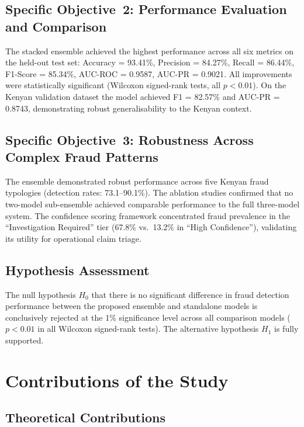 \documentclass[12pt,a4paper,oneside]{report}
\numberwithin{equation}{chapter}
\begin{document}
\subsection{Specific Objective~2: Performance Evaluation and Comparison}

The stacked ensemble achieved the highest performance across all six metrics on the held-out test
set: Accuracy = 93.41\%, Precision = 84.27\%, Recall = 86.44\%, F1-Score = 85.34\%,
AUC-ROC = 0.9587, AUC-PR = 0.9021. All improvements were statistically significant (Wilcoxon
signed-rank tests, all $p < 0.01$). On the Kenyan validation dataset the model achieved
F1 = 82.57\% and AUC-PR = 0.8743, demonstrating robust generalisability to the Kenyan context.

\subsection{Specific Objective~3: Robustness Across Complex Fraud Patterns}

The ensemble demonstrated robust performance across five Kenyan fraud typologies (detection rates:
73.1--90.1\%). The ablation studies confirmed that no two-model sub-ensemble achieved comparable
performance to the full three-model system. The confidence scoring framework concentrated fraud
prevalence in the ``Investigation Required'' tier (67.8\% vs.\ 13.2\% in ``High Confidence''),
validating its utility for operational claim triage.

\subsection{Hypothesis Assessment}

The null hypothesis $H_0$ that there is no significant difference in fraud detection performance
between the proposed ensemble and standalone models is conclusively rejected at the 1\%
significance level across all comparison models ($p < 0.01$ in all Wilcoxon signed-rank tests).
The alternative hypothesis $H_1$ is fully supported.

\section{Contributions of the Study}

\subsection{Theoretical Contributions}
\end{document}
